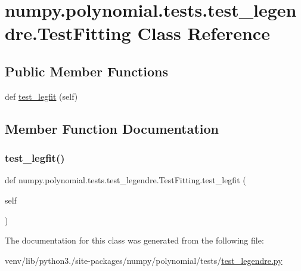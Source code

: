 \hypertarget{classnumpy_1_1polynomial_1_1tests_1_1test__legendre_1_1TestFitting}{}\section{numpy.\+polynomial.\+tests.\+test\+\_\+legendre.\+Test\+Fitting Class Reference}
\label{classnumpy_1_1polynomial_1_1tests_1_1test__legendre_1_1TestFitting}
\subsection*{Public Member Functions}
\begin{DoxyCompactItemize}
\item 
def \hyperlink{classnumpy_1_1polynomial_1_1tests_1_1test__legendre_1_1TestFitting_a4cb3372192e5231d5f229a89eedafe95}{test\+\_\+legfit} (self)
\end{DoxyCompactItemize}


\subsection{Member Function Documentation}
\mbox{\label{classnumpy_1_1polynomial_1_1tests_1_1test__legendre_1_1TestFitting_a4cb3372192e5231d5f229a89eedafe95}} 
\subsubsection{\texorpdfstring{test\+\_\+legfit()}{test\_legfit()}}
{\footnotesize\ttfamily def numpy.\+polynomial.\+tests.\+test\+\_\+legendre.\+Test\+Fitting.\+test\+\_\+legfit (\begin{DoxyParamCaption}\item[{}]{self }\end{DoxyParamCaption})}



The documentation for this class was generated from the following file\+:\begin{DoxyCompactItemize}
\item 
venv/lib/python3./site-\/packages/numpy/polynomial/tests/\hyperlink{test__legendre_8py}{test\+\_\+legendre.\+py}\end{DoxyCompactItemize}
